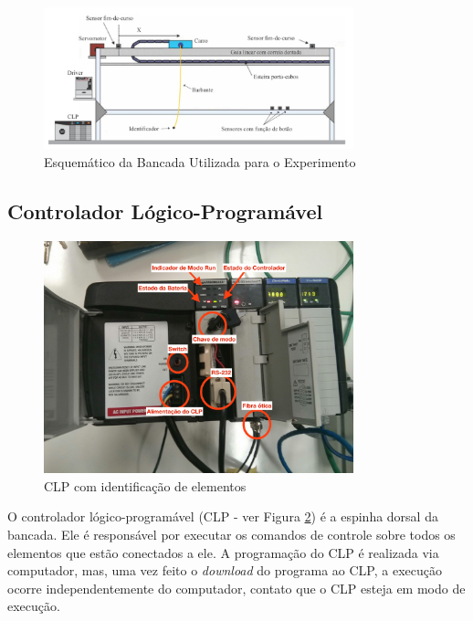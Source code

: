 \begin{figure}[hbt]
\centering
  \includegraphics[width=0.8\textwidth]{figs/fundamentos/bancadaEsquematico}
  \caption{Esquemático da Bancada Utilizada para o Experimento \cite{redytton}\label{bancadaEsquematico}}
\end{figure}

\subsection{Controlador Lógico-Programável}
\begin{figure}[!ht]
  \centering
    \includegraphics[width=0.8\textwidth]{figs/fundamentos/CLP.jpg}
    \caption{CLP com identificação de elementos\label{CLPcomentado}}
\end{figure}

O controlador lógico-programável (CLP - ver Figura \ref{CLPcomentado}) é a espinha dorsal da bancada. Ele é responsável por executar os comandos de controle sobre todos os elementos que estão conectados a ele. A programação do CLP é realizada via computador, mas, uma vez feito o \textit{download} do programa ao CLP, a execução ocorre independentemente do computador, contato que o CLP esteja em modo de execução.

